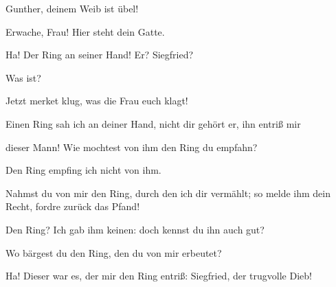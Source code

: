 \begin{drama}
\Siegfriedspeaks

Gunther, deinem Weib ist übel!


Erwache, Frau!
Hier steht dein Gatte.
 

\Brunnhildespeaks



Ha! Der Ring 
an seiner Hand!
Er? Siegfried?
 

Was ist?
 

\Hagenspeaks



Jetzt merket klug,
was die Frau euch klagt!
 

\Brunnhildespeaks



Einen Ring sah ich an deiner Hand,
nicht dir gehört er,
ihn entriß mir


dieser Mann!
Wie mochtest von ihm
den Ring du empfahn?
 

\Siegfriedspeaks



Den Ring empfing ich nicht von ihm.
 

\Brunnhildespeaks



Nahmst du von mir den Ring,
durch den ich dir vermählt;
so melde ihm dein Recht,
fordre zurück das Pfand!
 

\Guntherspeaks



Den Ring? Ich gab ihm keinen:
doch kennst du ihn auch gut?
 

\Brunnhildespeaks

Wo bärgest du den Ring,
den du von mir erbeutet?
 




\Brunnhildespeaks



Ha! Dieser war es,
der mir den Ring entriß:
Siegfried, der trugvolle Dieb!
 



\end{drama}
